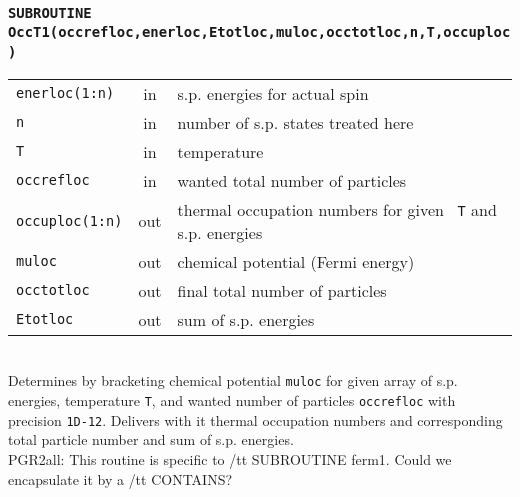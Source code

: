 \documentclass[final,1p]{elsarticle}
\newcommand{\PGRcomm}[1]{{\color{blue}\small PGR2all: #1}}
\begin{document}
\subsubsection*{\tt SUBROUTINE OccT1(occrefloc,enerloc,Etotloc,muloc,occtotloc,n,T,occuploc)}
\begin{tabular}{lcl}
 {\tt enerloc(1:n)} & in & s.p. energies for actual spin\\
 {\tt n} & in & number of s.p. states treated here\\
 {\tt T} & in & temperature\\
 {\tt occrefloc} & in & wanted total number of particles \\
 {\tt occuploc(1:n)} & out & thermal occupation numbers for given {\tt
   T} and s.p. energies\\
 {\tt muloc} & out & chemical potential (Fermi energy)\\
 {\tt occtotloc} & out& final total number of particles \\
 {\tt Etotloc} & out& sum of s.p. energies \\
\end{tabular}
\\[4pt]
Determines by bracketing chemical potential {\tt muloc} for given array of
s.p. energies, temperature {\tt T}, and wanted number of particles
{\tt occrefloc} with precision {\tt 1D-12}. Delivers with it
thermal occupation numbers and corresponding total particle number and
sum of s.p. energies.
\\
\PGRcomm{This routine is specific to {/tt SUBROUTINE ferm1}. Could we
encapsulate it by a {/tt CONTAINS}?}
\end{document}
